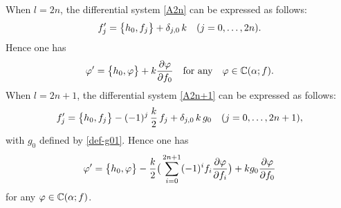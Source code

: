 \begin{prop} 
When $l=2n$, the differential system \eqref{A2n} can be expressed as follows:
\begin{equation}\Label{A2n-f-by-Pbr}
f_j'=\Pbr{h_0,f_j}+\delta_{j,0}\, k\quad(j=0,\ldots,2n). 
\end{equation}
Hence one has 
\begin{equation}\Label{A2n-by-Pbr}
\varphi'=\Pbr{h_0,\varphi}+k \frac{\partial \varphi}{\partial f_0}
\quad\text{for any}\quad \varphi\in \BC(\alpha;f). 
\end{equation}
When $l=2n+1$, the differential system \eqref{A2n+1} can be expressed as follows:
\begin{equation}\Label{A2n+1-f-by-Pbr}
f_j'=\Pbr{h_0,f_j}-(-1)^{j}\, \frac{k}{2}\,f_j+\delta_{j,0}\, k\, g_0
\quad(j=0,\ldots,2n+1),
\end{equation}
with $g_0$ defined by \eqref{def-g01}.
Hence one has 
\begin{equation}\Label{A2n+1-by-Pbr}
\varphi'=\Pbr{h_0,\varphi}-
\frac{k}{2}
\big(\sum_{i=0}^{2n+1}(-1)^i f_i\frac{\partial\varphi }{\partial f_i}\big)
+ k g_0 \frac{\partial \varphi}{\partial f_0}
\end{equation} 
for any $\varphi\in {\Bbb C}(\alpha;f)$.
\end{prop}

